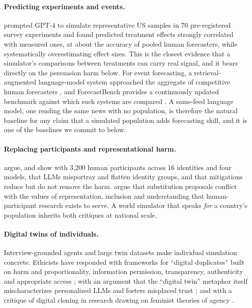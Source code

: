 \documentclass[11pt]{article}
\begin{document}
\paragraph{Predicting experiments and events.} \citet{ashokkumar2026predict} prompted GPT-4 to simulate representative US samples in 70 pre-registered survey experiments and found predicted treatment effects strongly correlated with measured ones, at about the accuracy of pooled human forecasters, while systematically overestimating effect sizes. This is the closest evidence that a simulator's comparisons between treatments can carry real signal, and it bears directly on the persuasion harm below. For event forecasting, a retrieval-augmented language-model system approached the aggregate of competitive human forecasters \citep{halawi2024forecasting}, and ForecastBench provides a continuously updated benchmark against which such systems are compared \citep{karger2025forecastbench}. A same-feed language model, one reading the same news with no population, is therefore the natural baseline for any claim that a simulated population adds forecasting skill, and it is one of the baselines we commit to below.

\paragraph{Replacing participants and representational harm.} \citet{wang2024misportray} argue, and show with 3,200 human participants across 16 identities and four models, that LLMs misportray and flatten identity groups, and that mitigations reduce but do not remove the harm. \citet{agnew2024illusion} argue that substitution proposals conflict with the values of representation, inclusion and understanding that human-participant research exists to serve. A world simulator that speaks \emph{for} a country's population inherits both critiques at national scale.

\paragraph{Digital twins of individuals.} Interview-grounded agents \citep{park2024selfreports} and large twin datasets \citep{toubia2025twin2k} make individual simulation concrete. Ethicists have responded with frameworks for ``digital duplicates'' built on harm and proportionality, information permission, transparency, authenticity and appropriate access \citep{hurshman2026duplicates}; with an argument that the ``digital twin'' metaphor itself mischaracterizes personalized LLMs and fosters misplaced trust \citep{annoni2026metaphor}; and with a critique of digital cloning in research drawing on feminist theories of agency \citep{brooke2025clones}.
\end{document}
